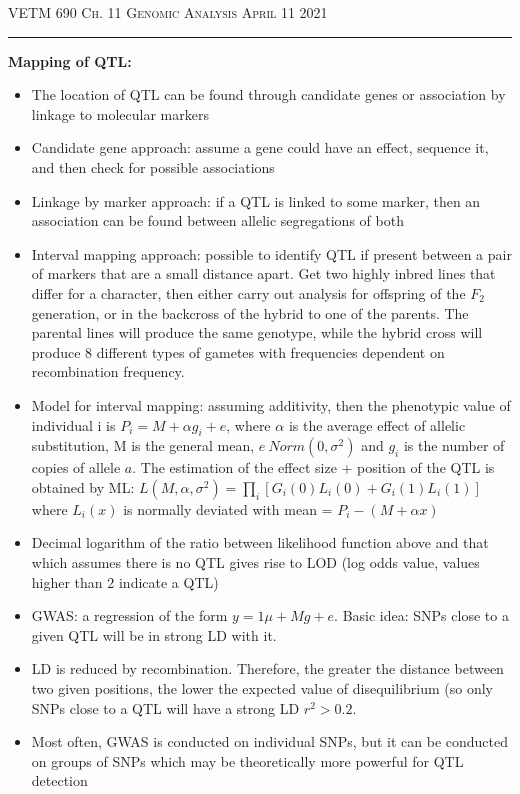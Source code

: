 \documentclass[12pt]{amsart}
\begin{document}
\thispagestyle{empty}

{\scshape VETM 690} \hfill {\scshape \Large  Ch. 11 Genomic Analysis} \hfill {\scshape April 11 2021}
\medskip
\hrule
\bigskip

{\large \bf Mapping of QTL:}
\begin{itemize}
\item The location of QTL can be found through candidate genes or association by linkage to molecular markers
\item Candidate gene approach: assume a gene could have an effect, sequence it, and then check for possible associations
\item Linkage by marker approach: if a QTL is linked to some marker, then an association can be found between allelic segregations of both
\item Interval mapping approach: possible to identify QTL if present between a pair of markers that are a small distance apart. Get two highly inbred lines that differ for a character, then either carry out analysis for offspring of the $F_2$ generation, or in the backcross of the hybrid to one of the parents. The parental lines will produce the same genotype, while the hybrid cross will produce 8 different types of gametes with frequencies dependent on recombination frequency. 
\item Model for interval mapping: assuming additivity, then the phenotypic value of individual i is $P_i = M + \alpha g_i + e$, where $\alpha$ is the average effect of allelic substitution, M is the general mean, $e ~ Norm(0, \sigma^2)$ and $g_i$ is the number of copies of allele $a$. The estimation of the effect size + position of the QTL is obtained by ML: $L(M, \alpha, \sigma^2) = \prod_i[G_i(0)L_i(0) + G_i(1)L_i(1)]$ where $L_i(x)$ is normally deviated with mean = $P_i - (M+\alpha x)$
\item Decimal logarithm of the ratio between likelihood function above and that which assumes there is no QTL gives rise to LOD (log odds value, values higher than 2 indicate a QTL)
\item GWAS: a regression of the form $y = 1\mu + Mg + e$. Basic idea: SNPs close to a given QTL will be in strong LD with it. 
\item LD is reduced by recombination. Therefore, the greater the distance between two given positions, the lower the expected value of disequilibrium (so only SNPs close to a QTL will have a strong LD $r^2 > 0.2$. 
\item Most often, GWAS is conducted on individual SNPs, but it can be conducted on groups of SNPs which may be theoretically more powerful for QTL detection

\end{itemize}
\end{document}
